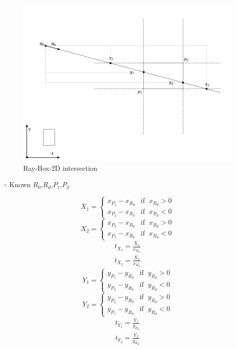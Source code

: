 \begin{figure}[H]
\caption[ray-box-2d-intersection]{Ray-Box-2D intersection}
\label{fig:ray-box-2d}
\centering
\includegraphics[width=\linewidth]{Figures/ray-box-2d-intersection.png}
\decoRule
\end{figure}

$\because$ Known $R_0$,\enspace$R_d$,\enspace$P_1$,\enspace$P_2$
\begin{multicols}{2}
\noindent
\[
X_1 =
\begin{cases}
x_{P_1} - x_{R_0} & \text{if }\;x_{R_d} > 0 \\
x_{P_2} - x_{R_0} & \text{if }\;x_{R_d} < 0
\end{cases}
\]
\[
X_2 =
\begin{cases}
x_{P_2} - x_{R_0} & \text{if }\;x_{R_d} > 0 \\
x_{P_1} - x_{R_0} & \text{if }\;x_{R_d} < 0
\end{cases}
\]
\[
\begin{array}{lr}
t_{X_1} = \frac{X_1}{x_{R_d}} \\
t_{X_2} = \frac{X_2}{x_{R_d}}
\end{array}
\]
\columnbreak
\[
Y_1 =
\begin{cases}
y_{P_1} - y_{R_0} & \text{if }\;y_{R_d} > 0 \\
y_{P_2} - y_{R_0} & \text{if }\;y_{R_d} < 0
\end{cases}
\]
\[
Y_2 =
\begin{cases}
y_{P_2} - y_{R_0} & \text{if }\;y_{R_d} > 0 \\
y_{P_1} - y_{R_0} & \text{if }\;y_{R_d} < 0
\end{cases}
\]
\[
\begin{array}{lr}
t_{Y_1} = \frac{Y_1}{y_{R_d}} \\
t_{Y_2} = \frac{Y_2}{y_{R_d}}
\end{array}
\]
\end{multicols}

